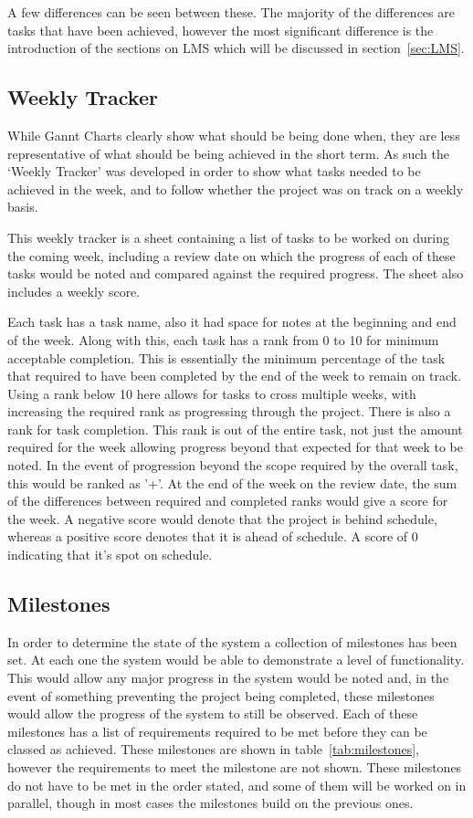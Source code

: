 A few differences can be seen between these.
The majority of the differences are tasks that have been achieved, however the most significant difference is the introduction of the sections on LMS which will be discussed in section~\ref{sec:LMS}.

\subsection{Weekly Tracker}
While Gannt Charts clearly show what should be being done when, they are less representative of what should be being achieved in the short term.
As such the `Weekly Tracker' was developed in order to show what tasks needed to be achieved in the week, and to follow whether the project was on track on a weekly basis.

This weekly tracker is a sheet containing a list of tasks to be worked on during the coming week, including a review date on which the progress of each of these tasks would be noted and compared against the required progress.
The sheet also includes a weekly score.

Each task has a task name, also it had space for notes at the beginning and end of the week.
Along with this, each task has a rank from 0 to 10 for minimum acceptable completion.
This is essentially the minimum percentage of the task that required to have been completed by the end of the week to remain on track.
Using a rank below 10 here allows for tasks to cross multiple weeks, with increasing the required rank as progressing through the project.
There is also a rank for task completion.
This rank is out of the entire task, not just the amount required for the week allowing progress beyond that expected for that week to be noted.
In the event of progression beyond the scope required by the overall task, this would be ranked as '+'.
At the end of the week on the review date, the sum of the differences between required and completed ranks would give a score for the week.
A negative score would denote that the project is behind schedule, whereas a positive score denotes that it is ahead of schedule.
A score of 0 indicating that it's spot on schedule.

\subsection{Milestones}
In order to determine the state of the system a collection of milestones has been set.
At each one the system would be able to demonstrate a level of functionality.
This would allow any major progress in the system would be noted and, in the event of something preventing the project being completed, these milestones would allow the progress of the system to still be observed.
Each of these milestones has a list of requirements required to be met before they can be classed as achieved.
These milestones are shown in table~\ref{tab:milestones}, however the requirements to meet the milestone are not shown.
These milestones do not have to be met in the order stated, and some of them will be worked on in parallel, though in most cases the milestones build on the previous ones.

